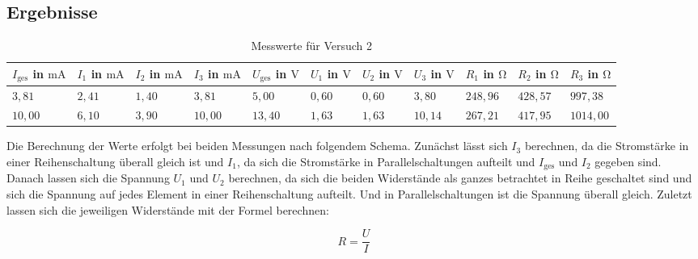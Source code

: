     \subsection{Ergebnisse}

        \begin{table}[h!]
            \centering
            \begin{tabular}{|l|l|l|l|l|l|l|l|l|l|l|}
                \hline
                $I_{\mathrm{ges}}$ in $\mathrm{mA}$ & $I_{1}$ in $\mathrm{mA}$ & $I_{2}$ in $\mathrm{mA}$ & $I_{3}$ in $\mathrm{mA}$ & $U_{\mathrm{ges}}$ in $\mathrm{V}$ & $U_{1}$ in $\mathrm{V}$ & $U_{2}$ in $\mathrm{V}$ & $U_{3}$ in $\mathrm{V}$ & $R_{1}$ in $\mathrm{\Omega}$ & $R_{2}$ in $\mathrm{\Omega}$ & $R_{3}$ in $\mathrm{\Omega}$\\
                \hline\hline
                $3,81$ & $2,41$ & $1,40$ & $3,81$ & $5,00$ & $0,60$ & $0,60$ & $3,80$ & $248,96$ & $428,57$ & $997,38$\\
                \hline
                $10,00$ & $6,10$ & $3,90$ & $10,00$ & $13,40$ & $1,63$ & $1,63$ & $10,14$ & $267,21$ & $417,95$ & $1014,00$\\
                \hline
            \end{tabular}
            \caption{Messwerte für Versuch 2}
            \label{tab:versuch2}
        \end{table}

        Die Berechnung der Werte erfolgt bei beiden Messungen nach folgendem Schema. Zunächst lässt sich $I_{3}$ berechnen, da die Stromstärke in einer Reihenschaltung überall gleich ist und $I_{1}$, da sich die Stromstärke in Parallelschaltungen aufteilt und $I_{\mathrm{ges}}$ und $I_{2}$ gegeben sind.
        Danach lassen sich die Spannung $U_{1}$ und $U_{2}$ berechnen, da sich die beiden Widerstände als ganzes betrachtet in Reihe geschaltet sind und sich die Spannung auf jedes Element in einer Reihenschaltung aufteilt. Und in Parallelschaltungen ist die Spannung überall gleich.
        Zuletzt lassen sich die jeweiligen Widerstände mit der Formel berechnen:

        \begin{equation}
            R = \frac{U}{I}
            \label{eq:widerstand}
        \end{equation}

